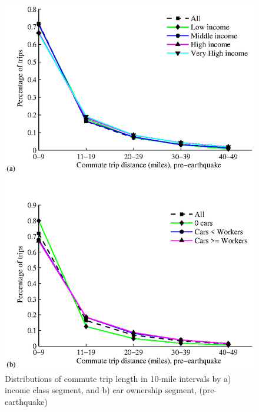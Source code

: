 \begin{figure}[h!]
\centering
\includegraphics[width=5in]{FIGS/equity_trip_distance_income_cars_to_and_from_work.eps} 
\caption{Distributions of commute trip length in 10-mile intervals  by a) income class segment, and b) car ownership segment,  (pre-earthquake)}
\label{fig:lengthIncomeBars}
\end{figure}

